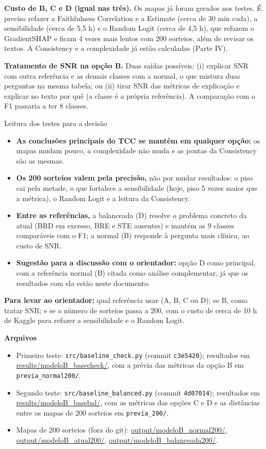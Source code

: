 \documentclass[11pt,a4paper]{article}
\begin{document}
\textbf{Custo de B, C e D (igual nas três).} Os mapas já foram gerados nos testes. É preciso refazer a Faithfulness Correlation e a Estimate (cerca de 30 min cada), a sensibilidade (cerca de 5,5 h) e o Random Logit (cerca de 4,5 h), que refazem o GradientSHAP e ficam 4 vezes mais lentos com 200 sorteios, além de revisar os textos. A Consistency e a complexidade já estão calculadas (Parte IV).

\textbf{Tratamento de SNR na opção B.} Duas saídas possíveis: (i) explicar SNR com outra referência e as demais classes com a normal, o que mistura duas perguntas na mesma tabela; ou (ii) tirar SNR das métricas de explicação e explicar no texto por quê (a classe é a própria referência). A comparação com o F1 passaria a ter 8 classes.

\begin{infobox}[note]{Leitura dos testes para a decisão}
\begin{itemize}
\item \textbf{As conclusões principais do TCC se mantêm em qualquer opção:} os mapas mudam pouco, a complexidade não muda e as pontas da Consistency são as mesmas.
\item \textbf{Os 200 sorteios valem pela precisão,} não por mudar resultados: o piso cai pela metade, o que fortalece a sensibilidade (hoje, piso 5 vezes maior que a métrica), o Random Logit e a leitura da Consistency.
\item \textbf{Entre as referências,} a balanceada (D) resolve o problema concreto da atual (BRD em excesso, BRE e STE ausentes) e mantém as 9 classes comparáveis com o F1; a normal (B) responde à pergunta mais clínica, ao custo de SNR.
\item \textbf{Sugestão para a discussão com o orientador:} opção D como principal, com a referência normal (B) citada como análise complementar, já que os resultados com ela estão neste documento.
\end{itemize}
\end{infobox}

\textbf{Para levar ao orientador:} qual referência usar (A, B, C ou D); se B, como tratar SNR; e se o número de sorteios passa a 200, com o custo de cerca de 10 h de Kaggle para refazer a sensibilidade e o Random Logit.

\vspace{0.5em}
{\small\sloppy \textbf{Arquivos}
\begin{itemize}
\item Primeiro teste: \texttt{src/baseline\_check.py} (commit \texttt{c3e5420}); resultados em \url{results/modeloB_basecheck/}, com a prévia das métricas da opção B em \texttt{previa\_normal200/}.
\item Segundo teste: \texttt{src/baseline\_balanced.py} (commit \texttt{4d07014}); resultados em \url{results/modeloB_basebal/}, com as métricas das opções C e D e as distâncias entre os mapas de 200 sorteios em \texttt{previa\_200/}.
\item Mapas de 200 sorteios (fora do git): \url{output/modeloB_normal200/}, \url{output/modeloB_atual200/}, \url{output/modeloB_balanceada200/}.
\end{itemize}}
\end{document}
